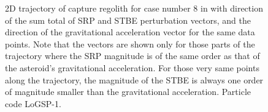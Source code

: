 \FloatBarrier
\begin{figure}[htb]
\centering
\captionsetup{justification=centering}
\caption{2D trajectory of capture regolith for case number 8 in  with direction of the sum total of \gls{SRP} and \gls{STBE} perturbation vectors, and the direction of the gravitational acceleration vector for the same data points. Note that the vectors are shown only for those parts of the trajectory where the \gls{SRP} magnitude is of the same order as that of the asteroid's gravitational acceleration. For those very same points along the trajectory, the magnitude of the \gls{STBE} is always one order of magnitude smaller than the gravitational acceleration. Particle code LoGSP-1.}
\label{fig:LoGSP_1_capture_case_8_2d_trajectory_totalPerturbations_and_gravity_vectors}
\end{figure}
